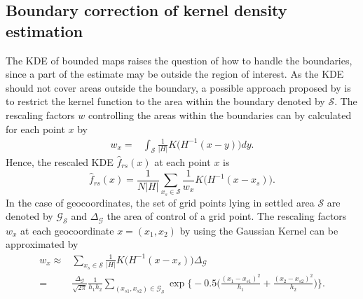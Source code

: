 \subsection{Boundary correction of kernel density estimation}
The KDE of bounded maps raises the question of how to handle the boundaries, since a part of the estimate may be outside the region of interest. As the KDE should not cover areas outside the boundary, a possible approach proposed by \cite{Jones1993} is to restrict the kernel function to the area within the boundary denoted by $\mathcal{S}$. The rescaling factors $w$ controlling the areas within the boundaries can by calculated for each point $x$ by 
\begin{align*}
    w_x = & \int_{\mathcal{S}} \frac{1}{|H|} K \Big(H^{-1}(x-y) \Big) dy.
\end{align*}
Hence, the rescaled KDE $\hat{f}_{rs}(x)$ at each point $x$ is 
\begin{equation}\label{eq:f_rs}
    \hat{f}_{rs}(x) = \frac{1}{N|H|} \sum_{x_s \in \mathcal{S}} \frac{1}{w_x} K \Big(H^{-1}(x-x_s) \Big).
\end{equation}
In the case of geocoordinates, the set of grid points lying in settled area $\mathcal{S}$ are denoted by $\mathcal{G}_{\mathcal{S}}$ and $\Delta_{\mathcal{G}}$ the area of control of a grid point. The rescaling factors $w_x$ at each geocoordinate $x = (x_1, x_2) $ by using the Gaussian Kernel can be approximated by 
\begin{align}\label{eq:w_x}
    w_x \approx & \sum_{x_s \in \mathcal{S}} \frac{1}{|H|} K \Big(H^{-1}(x-x_s) \Big) \Delta_{\mathcal{G}} \nonumber \\ 
    = & \frac{\Delta_{\mathcal{G}}}{\sqrt{2\pi}} \frac{1}{h_1 h_2} \sum_{(x_{s1}, x_{s2}) \in \mathcal{G}_\mathcal{S}} \exp{\Bigg\{-0.5 \Bigg(\frac{(x_1 - x_{s1})^2}{h_1}  + \frac{(x_2 - x_{s2})^2}{h_2}\Bigg) \Bigg\}}.
\end{align}


